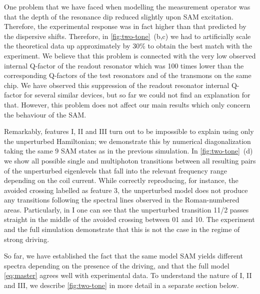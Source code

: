 \documentclass[%
 aps, prx,
 amsmath,amssymb,
 reprint,%
superscriptaddress
]{revtex4-2}
\begin{document}
One problem that we have faced when modelling the measurement operator was that the depth of the resonance dip reduced slightly upon SAM excitation. Therefore, the experimental response was in fact higher than that predicted by the dispersive shifts. Therefore, in \autoref{fig:two-tone}~(b,c) we had to artificially scale the theoretical data up approximately by 30\% to obtain the best match with the experiment. We believe that this problem is connected with the very low observed internal Q-factor of the readout resonator which was 100 times lower than the corresponding Q-factors of the test resonators and of the transmons on the same chip. We have observed this suppression of the readout resonator internal Q-factor for several similar devices, but so far we could not find an explanation for that. However, this problem does not affect our main results which only concern the behaviour of the SAM.



Remarkably, features I, II and III turn out to be 
impossible to explain using only the unperturbed 
Hamiltonian; we demonstrate this by numerical 
diagonalization taking the same 9 SAM states as 
in the previous simulation. In \autoref{fig:two-tone}~(d) we show all possible 
single and multiphoton transitions between all resulting pairs of the unperturbed eigenlevels that fall into the relevant frequency range depending on the coil current. While correctly reproducing, for 
instance, the avoided crossing labelled as 
feature 3, the unperturbed model does not produce any transitions following the spectral lines observed in the Roman-numbered areas. Particularly, in I one can see that the unperturbed transition 11/2 passes straight in the middle of the avoided crossing between 01 and 10. The experiment and the full simulation demonstrate that this is not the case in the regime of strong driving.

So far, we have established the fact that the 
same model SAM yields different spectra depending 
on the presence of the driving, and that the full 
model \autoref{eq:master} agrees well with 
experimental data. To understand the nature of I, 
II and III, we describe \autoref{fig:two-tone} in 
more detail in a separate section below.
\end{document}
